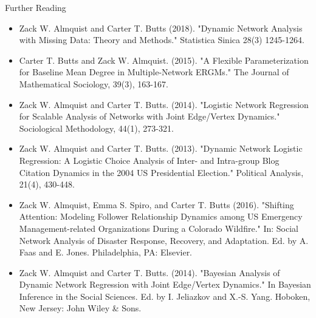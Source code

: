 \documentclass[10pt]{beamer}
\begin{document}
\begin{frame}{Further Reading}
\tiny
\begin{itemize}
\item Zack W. Almquist and Carter T. Butts (2018). "Dynamic Network Analysis with Missing Data: Theory and Methods." Statistica Sinica 28(3) 1245-1264. 
\item Carter T. Butts and Zack W. Almquist. (2015). "A Flexible Parameterization for Baseline Mean Degree in Multiple-Network ERGMs." The Journal of Mathematical Sociology, 39(3), 163-167.
\item Zack W. Almquist and Carter T. Butts. (2014). "Logistic Network Regression for Scalable Analysis of Networks with Joint Edge/Vertex Dynamics." Sociological Methodology, 44(1), 273-321.
\item Zack W. Almquist and Carter T. Butts. (2013). "Dynamic Network Logistic Regression: A Logistic Choice Analysis of Inter- and Intra-group Blog Citation Dynamics in the 2004 US Presidential Election." Political Analysis, 21(4), 430-448.
\item Zack W. Almquist, Emma S. Spiro, and Carter T. Butts (2016). "Shifting Attention: Modeling Follower Relationship Dynamics among US Emergency Management-related Organizations During a Colorado Wildfire." In: Social Network Analysis of Disaster Response, Recovery, and Adaptation. Ed. by A. Faas and E. Jones. Philadelphia, PA: Elsevier.
\item Zack W. Almquist and Carter T. Butts. (2014). "Bayesian Analysis of Dynamic Network Regression with Joint Edge/Vertex Dynamics." In Bayesian Inference in the Social Sciences. Ed. by I. Jeliazkov and X.-S. Yang. Hoboken, New Jersey: John Wiley \& Sons.
\end{itemize}
\end{frame}
\end{document}
